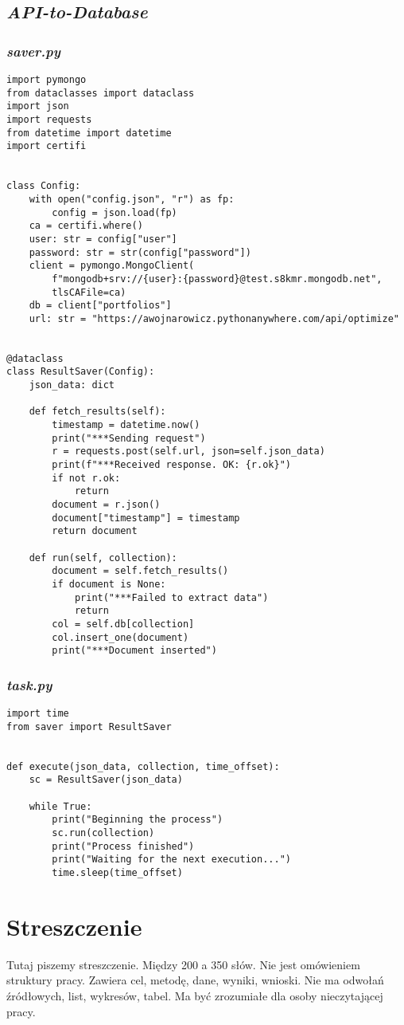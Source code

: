 \documentclass[12pt,a4paper,twoside,openany]{book}
\begin{document}
\section*{\textit{API-to-Database}}
\subsection*{\textit{saver.py}}


\begin{verbatim}
import pymongo
from dataclasses import dataclass
import json
import requests
from datetime import datetime
import certifi


class Config:
    with open("config.json", "r") as fp:
        config = json.load(fp)
    ca = certifi.where()
    user: str = config["user"]
    password: str = str(config["password"])
    client = pymongo.MongoClient(
        f"mongodb+srv://{user}:{password}@test.s8kmr.mongodb.net", 
        tlsCAFile=ca)
    db = client["portfolios"]
    url: str = "https://awojnarowicz.pythonanywhere.com/api/optimize"


@dataclass
class ResultSaver(Config):
    json_data: dict

    def fetch_results(self):
        timestamp = datetime.now()
        print("***Sending request")
        r = requests.post(self.url, json=self.json_data)
        print(f"***Received response. OK: {r.ok}")
        if not r.ok:
            return
        document = r.json()
        document["timestamp"] = timestamp
        return document

    def run(self, collection):
        document = self.fetch_results()
        if document is None:
            print("***Failed to extract data")
            return
        col = self.db[collection]
        col.insert_one(document)
        print("***Document inserted")
\end{verbatim}

\subsection*{\textit{task.py}}


\begin{verbatim}
import time
from saver import ResultSaver


def execute(json_data, collection, time_offset):
    sc = ResultSaver(json_data)

    while True:
        print("Beginning the process")
        sc.run(collection)
        print("Process finished")
        print("Waiting for the next execution...")
        time.sleep(time_offset)
\end{verbatim}
\clearpage

\chapter*{Streszczenie}

Tutaj piszemy streszczenie. Między 200 a 350 słów. Nie jest omówieniem struktury pracy. Zawiera cel, metodę, dane, wyniki, wnioski. Nie ma odwołań źródłowych, list, wykresów, tabel. Ma być zrozumiałe dla osoby nieczytającej pracy.
\end{document}
